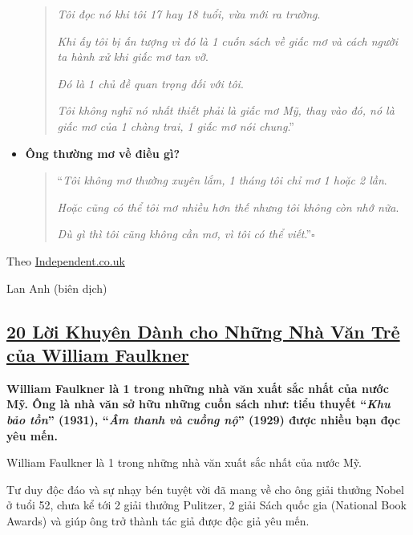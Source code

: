 \documentclass{article}
\begin{document}
\begin{itemize}
\begin{quotation}
		\textit{Tôi đọc nó khi tôi 17 hay 18 tuổi, vừa mới ra trường}.
		
		\textit{Khi ấy tôi bị ấn tượng vì đó là 1 cuốn sách về giấc mơ và cách người ta hành xử khi giấc mơ tan vỡ}.
		
		\textit{Đó là 1 chủ đề quan trọng đối với tôi}.
		
		\textit{Tôi không nghĩ nó nhất thiết phải là giấc mơ Mỹ, thay vào đó, nó là giấc mơ của 1 chàng trai, 1 giấc mơ nói chung}.''
	\end{quotation}
	
	\item \textbf{Ông thường mơ về điều gì?}
	
	\begin{quotation}
		``\textit{Tôi không mơ thường xuyên lắm, 1 tháng tôi chỉ mơ 1 hoặc 2 lần}.
		
		\textit{Hoặc cũng có thể tôi mơ nhiều hơn thế nhưng tôi không còn nhớ nữa}.
		
		\textit{Dù gì thì tôi cũng không cần mơ, vì tôi có thể viết}.''\hfill$\square$
	\end{quotation}    
\end{itemize}

\begin{flushright}
	Theo \href{https://www.independent.co.uk/arts-entertainment/books/features/haruki-murakami-interview-killing-commendatore-novel-new-a8578696.html}{Independent.co.uk}
	
	Lan Anh (biên dịch)
\end{flushright}


\subsection{\href{http://tramdoc.vn/tin-tuc/20-loi-khuyen-danh-cho-nhung-nha-van-tre-cua-william-faulkner-nZDe5W.html}{20 Lời Khuyên Dành cho Những Nhà Văn Trẻ của William Faulkner}}

\textbf{William Faulkner là 1 trong những nhà văn xuất sắc nhất của nước Mỹ. Ông là nhà văn sở hữu những cuốn sách như: tiểu thuyết ``\textit{Khu bảo tồn}'' (1931), ``\textit{Âm thanh và cuồng nộ}'' (1929) được nhiều bạn đọc yêu mến.}

%
William Faulkner là 1 trong những nhà văn xuất sắc nhất của nước Mỹ.

Tư duy độc đáo và sự nhạy bén tuyệt vời đã mang về cho ông giải thưởng Nobel ở tuổi 52, chưa kể tới 2 giải thưởng Pulitzer, 2 giải Sách quốc gia (National Book Awards) và giúp ông trở thành tác giả được độc giả yêu mến.
\end{document}
